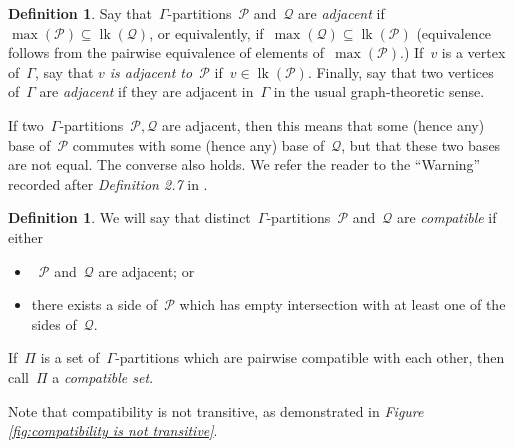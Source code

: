 \documentclass[11pt]{amsart}
\theoremstyle{definition}
\theoremstyle{definition}
\theoremstyle{definition}
\theoremstyle{definition}
\newtheorem{definition}[theorem]{Definition}
\newcommand{\calQ}{\mathcal{Q}}
\newcommand{\calP}{\mathcal{P}} %
\newcommand{\link}[1]{\operatorname{lk}({#1})} %
\newcommand{\mx}[1]{\operatorname{max}({#1})}
\begin{document}
\begin{definition}\label{def:adjacency}
    Say that~$\Gamma$-partitions~$\calP$ and~$\calQ$ are \emph{adjacent} if~$\mx{\calP} \subseteq \link{\calQ}$, or equivalently, if~$\mx{\calQ} \subseteq \link{\calP}$ (equivalence follows from the pairwise equivalence of elements of~$\mx{\calP}$.) If~$v$ is a vertex of~$\Gamma$, say that \emph{$v$ is adjacent to~$\calP$} if~$v \in \link{\calP}$. Finally, say that two vertices of~$\Gamma$ are \emph{adjacent} if they are adjacent in~$\Gamma$ in the usual graph-theoretic sense.
\end{definition}

If two~$\Gamma$-partitions~$\calP, \calQ$ are adjacent, then this means that some (hence any) base of~$\calP$ commutes with some (hence any) base of~$\calQ$, but that these two bases are not equal. The converse also holds. We refer the reader to the ``Warning'' recorded after \emph{Definition 2.7} in \cite{BregmanCharneyVogtmannOuterSpaceRAAGs23}.

\begin{definition} \label{def:compatibility}
    We will say that distinct~$\Gamma$-partitions~$\calP$ and~$\calQ$ are \emph{compatible} if either
    \begin{itemize}
        \item~$\calP$ and~$\calQ$ are adjacent; or
        \item there exists a side of~$\calP$ which has empty intersection with at least one of the sides of~$\calQ$.
    \end{itemize}

    If~$\Pi$ is a set of~$\Gamma$-partitions which are pairwise compatible with each other, then call~$\Pi$ a \emph{compatible set}.
\end{definition}

Note that compatibility is not transitive, as demonstrated in \emph{Figure \ref{fig:compatibility is not transitive}}.
\end{document}
